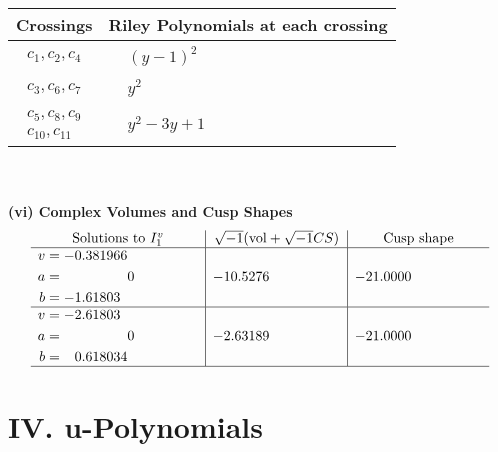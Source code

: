 \documentclass[1p]{elsarticle_modified}
\theoremstyle{definition}
\newcommand{\I}{\sqrt{-1}}
\begin{document}
\begin{tabular}{m{50pt}|m{274pt}}
Crossings & \hspace{64pt}Riley Polynomials at each crossing \\
\hline $$\begin{aligned}c_{1},c_{2},c_{4}\end{aligned}$$&$\begin{aligned}
&(y-1)^2
\end{aligned}$\\
\hline $$\begin{aligned}c_{3},c_{6},c_{7}\end{aligned}$$&$\begin{aligned}
&y^2
\end{aligned}$\\
\hline $$\begin{aligned}c_{5},c_{8},c_{9}\\c_{10},c_{11}\end{aligned}$$&$\begin{aligned}
&y^2-3 y+1
\end{aligned}$\\
\hline
\end{tabular}\\~\\
\newpage\flushleft \textbf{(vi) Complex Volumes and Cusp Shapes}
$$\begin{array}{c|c|c}  
\text{Solutions to }I^v_{1}& \I (\text{vol} + \sqrt{-1}CS) & \text{Cusp shape}\\
 \hline 
\begin{aligned}
v &= -0.381966\phantom{ +0.000000I} \\
a &= \phantom{-0.000000 } 0 \\
b &= -1.61803\phantom{ +0.000000I}\end{aligned}
 & -10.5276\phantom{ +0.000000I} & -21.0000\phantom{ +0.000000I} \\ \hline\begin{aligned}
v &= -2.61803\phantom{ +0.000000I} \\
a &= \phantom{-0.000000 } 0 \\
b &= \phantom{-}0.618034\phantom{ +0.000000I}\end{aligned}
 & -2.63189\phantom{ +0.000000I} & -21.0000\phantom{ +0.000000I}\\
 \hline 
 \end{array}$$\newpage
\newpage\renewcommand{\arraystretch}{1}
\centering \section*{ IV. u-Polynomials}
\end{document}

